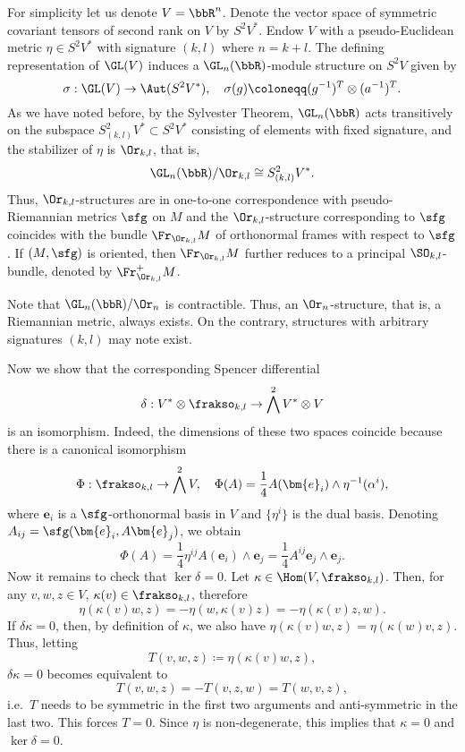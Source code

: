 \begin{example}\label{ex pseudo-riemannian structure}
    For simplicity let us denote $V=\bbR^n$. Denote the vector space of symmetric covariant tensors of second rank on $V$ by $S^2V^\ast$. Endow $V$ with a pseudo-Euclidean metric $\eta\in S^2V^\ast$ with signature $(k,l)$ where $n=k+l$. The defining representation of $\GL(V)$ induces a $\GL_n(\bbR)$-module structure on $S^2 V$ given by 
    \[\sigma:\GL(V)\to \Aut(S^2 V^\ast),\quad \sigma(g)\coloneqq (g^{-1})^T\otimes (a^{-1})^T.\label{eq 2.2.21 RS2}\]
    As we have noted before, by the Sylvester Theorem, $\GL_n(\bbR)$ acts transitively on the subspace $S^2_{(k,l)}V^\ast\subset S^2 V^\ast$ consisting of elements with fixed signature, and the stabilizer of $\eta$ is $\Or_{k,l}$, that is,
    \[\GL_n(\bbR)\slash \Or_{k,l}\cong S^2_{(k,l)}V^\ast.\]
    Thus, $\Or_{k,l}$-structures are in one-to-one correspondence with pseudo-Riemannian metrics $\sfg$ on $M$ and the $\Or_{k,l}$-structure corresponding to $\sfg$ coincides with the bundle $\Fr_{\Or_{k,l}}M$ of orthonormal frames with respect to $\sfg$. If $(M,\sfg)$ is oriented, then $\Fr_{\Or_{k,l}}M$ further reduces to a principal $\SO_{k,l}$-bundle, denoted by $\Fr^+_{\Or_{k,l}}M$. 
    
    Note that $\GL_n(\bbR)\slash \Or_n$ is contractible. Thus, an $\Or_n$-structure, that is, a Riemannian metric, always exists. On the contrary, structures with arbitrary signatures $(k,l)$ may note exist. 
    
    Now we show that the corresponding Spencer differential 
    \[\delta: V^\ast\otimes \frakso_{k,l}\to \bigwedge^2 V^\ast\otimes V\]
    is an isomorphism. Indeed, the dimensions of these two spaces coincide because there is a canonical isomorphism 
    \[\Phi: \frakso_{k,l}\to \bigwedge^2 V,\quad \Phi(A)= \frac14 A(\bm{e}_i)\wedge \eta^{-1}(\alpha^i),\]
    where $\bm{e}_i$ is a $\sfg$-orthonormal basis in $V$ and $\{\eta^i\}$ is the dual basis. Denoting $A_{ij}=\sfg(\bm{e}_i,A\bm{e}_j)$, we obtain 
    \[\Phi(A)=\frac14 \eta^{ij}A(\bm{e}_i)\wedge\bm{e}_j=\frac14 A^{ij}\bm{e}_j\wedge\bm{e}_j.\]
    Now it remains to check that $\ker\delta=0$. Let $\kappa\in \Hom(V,\frakso_{k,l})$. Then, for any $v,w,z\in V$, $\kappa(v)\in\frakso_{k,l}$, therefore 
    \[\eta(\kappa(v)w,z)=-\eta(w,\kappa(v)z)=-\eta(\kappa(v)z,w).\]
    If $\delta\kappa=0$, then, by definition of $\kappa$, we  also have $\eta(\kappa(v)w,z)=\eta(\kappa(w)v,z)$. Thus, letting
    \[T(v,w,z)\coloneqq \eta(\kappa(v)w,z),\]
    $\delta\kappa=0$ becomes equivalent to 
    \[T(v,w,z)=-T(v,z,w)=T(w,v,z),\]
    i.e.\ $T$ needs to be symmetric in the first two arguments and anti-symmetric in the last two. This forces $T=0$. Since $\eta$ is non-degenerate, this implies that $\kappa=0$ and $\ker\delta=0$. 
    

\end{example}
